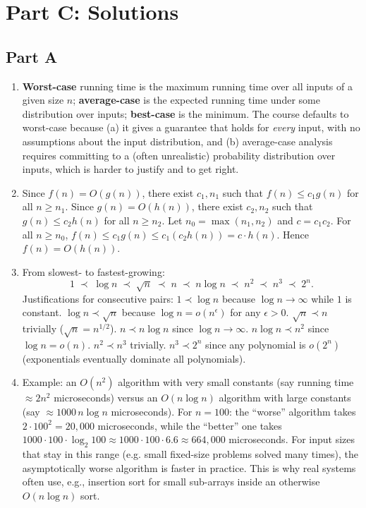 \documentclass[11pt]{article}
\begin{document}
\newpage
\section*{Part C: Solutions}

\subsection*{Part A}

\begin{enumerate}[label=\textbf{A\arabic*.}, leftmargin=2.2em]

\item \textbf{Worst-case} running time is the maximum running time over all inputs of a
given size $n$; \textbf{average-case} is the expected running time under some
distribution over inputs; \textbf{best-case} is the minimum. The course defaults to
worst-case because (a) it gives a guarantee that holds for \emph{every} input, with no
assumptions about the input distribution, and (b) average-case analysis requires
committing to a (often unrealistic) probability distribution over inputs, which is harder
to justify and to get right.

\item Since $f(n) = O(g(n))$, there exist $c_1, n_1$ such that $f(n) \le c_1 g(n)$ for all
$n \ge n_1$. Since $g(n) = O(h(n))$, there exist $c_2, n_2$ such that $g(n) \le c_2 h(n)$
for all $n \ge n_2$. Let $n_0 = \max(n_1, n_2)$ and $c = c_1 c_2$. For all $n \ge n_0$,
$f(n) \le c_1 g(n) \le c_1 (c_2 h(n)) = c \cdot h(n)$. Hence $f(n) = O(h(n))$.

\item From slowest- to fastest-growing:
\[
  1 \;\prec\; \log n \;\prec\; \sqrt{n} \;\prec\; n \;\prec\; n\log n \;\prec\; n^2 \;\prec\;
  n^3 \;\prec\; 2^n.
\]
Justifications for consecutive pairs: $1 \prec \log n$ because $\log n \to \infty$ while
$1$ is constant. $\log n \prec \sqrt n$ because $\log n = o(n^\epsilon)$ for any
$\epsilon > 0$. $\sqrt n \prec n$ trivially ($\sqrt n = n^{1/2}$). $n \prec n\log n$ since
$\log n \to \infty$. $n \log n \prec n^2$ since $\log n = o(n)$. $n^2 \prec n^3$ trivially.
$n^3 \prec 2^n$ since any polynomial is $o(2^n)$ (exponentials eventually dominate all
polynomials).

\item Example: an $O(n^2)$ algorithm with very small constants (say running time $\approx
2n^2$ microseconds) versus an $O(n\log n)$ algorithm with large constants (say $\approx
1000 \, n\log n$ microseconds). For $n = 100$: the ``worse'' algorithm takes
$2\cdot 100^2 = 20{,}000$ microseconds, while the ``better'' one takes
$1000 \cdot 100 \cdot \log_2 100 \approx 1000 \cdot 100 \cdot 6.6 \approx 664{,}000$
microseconds. For input sizes that stay in this range (e.g. small fixed-size problems
solved many times), the asymptotically worse algorithm is faster in practice. This is why
real systems often use, e.g., insertion sort for small sub-arrays inside an otherwise
$O(n\log n)$ sort.


\end{enumerate}
\end{document}
